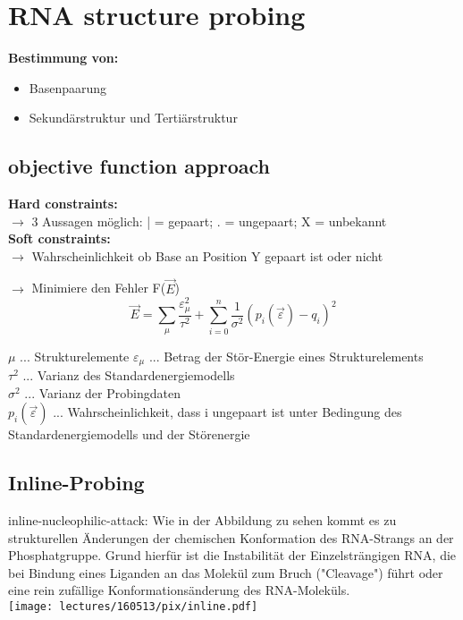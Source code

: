 \section{RNA structure probing}

\textbf{Bestimmung von:}
\begin{itemize}
\item Basenpaarung
\item Sekundärstruktur und Tertiärstruktur
\end{itemize}

\subsection{objective function approach}
\textbf{Hard constraints:} \\
$\rightarrow$ 3 Aussagen möglich: | = gepaart; . = ungepaart; X = unbekannt \\
\textbf{Soft constraints:} \\ 
$\rightarrow$ Wahrscheinlichkeit ob Base an Position Y gepaart ist oder nicht 

$\rightarrow$ Minimiere den Fehler F($\vec{E}$) \\
\begin{equation}
\vec{E} = \sum_{\mu} \dfrac{\varepsilon_{\mu}^{2}}{\tau^2} + \sum_{i = 0}^{n} \dfrac{1}{\sigma^2}(p_i(\vec{\varepsilon}) -q_i)^2
\end{equation} 

$\mu$ ... Strukturelemente
$\varepsilon_{\mu}$ ... Betrag der Stör-Energie eines Strukturelements\\
$\tau^2$ ... Varianz des Standardenergiemodells \\
$\sigma^2$ ... Varianz der Probingdaten \\
$p_i(\vec{\varepsilon})$ ... Wahrscheinlichkeit, dass i ungepaart ist unter Bedingung des Standardenergiemodells und der Störenergie

\subsection{Inline-Probing}
inline-nucleophilic-attack: Wie in der Abbildung zu sehen kommt es zu strukturellen Änderungen der chemischen Konformation des RNA-Strangs an der Phosphatgruppe. Grund hierfür ist die Instabilität der Einzelsträngigen RNA, die bei Bindung eines Liganden an das Molekül zum Bruch ("Cleavage") führt oder eine rein zufällige Konformationsänderung des RNA-Moleküls. \\
\texttt{[image: lectures/160513/pix/inline.pdf]}

